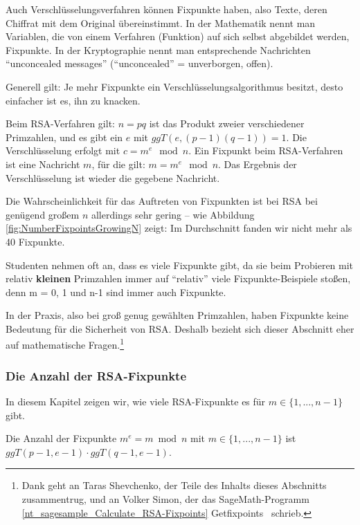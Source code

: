 \begin{refsegment}
Auch Verschlüsselungsverfahren können Fixpunkte haben, also Texte, deren Chiffrat
mit dem Original übereinstimmt. In der Mathematik nennt man Variablen, die von einem
Verfahren (Funktion) auf sich selbst abgebildet werden, Fixpunkte. In der Kryptographie nennt man entsprechende Nachrichten "`unconcealed messages"' ("`unconcealed"' = unverborgen, offen).

Generell gilt: Je mehr Fixpunkte ein Verschlüsselungsalgorithmus besitzt,
desto einfacher ist es, ihn zu knacken.

Beim RSA-Verfahren gilt: $n=pq$ ist das Produkt zweier verschiedener Primzahlen, und
es gibt ein $e$ mit $ggT(e,(p-1)(q-1))=1$. Die Verschlüsselung erfolgt mit
$c = m^e \mod n$.
Ein Fixpunkt beim RSA-Verfahren ist eine Nachricht $m$, für die gilt:
$m = m^e \mod n$. Das Ergebnis der Verschlüsselung ist wieder die gegebene
Nachricht.

Die Wahrscheinlichkeit für das Auftreten von Fixpunkten ist bei RSA bei genügend
großem $n$ allerdings sehr gering -- wie Abbildung \ref{fig:NumberFixpointsGrowingN}
zeigt: Im Durchschnitt fanden wir nicht mehr als 40 Fixpunkte.

Studenten nehmen oft an, dass es viele Fixpunkte gibt, da sie beim Probieren mit
relativ \textbf{kleinen} Primzahlen immer auf "`relativ"' viele Fixpunkte-Beispiele
stoßen, denn m = 0, 1 und n-1 sind immer auch Fixpunkte.

In der Praxis, also bei groß genug gewählten Primzahlen, haben Fixpunkte keine
Bedeutung für die Sicherheit von RSA. Deshalb bezieht sich dieser Abschnitt
eher auf mathematische Fragen.\footnote{%
Dank geht an Taras Shevchenko, der Teile des Inhalts dieses Abschnitts zusammentrug, und an Volker Simon, der das SageMath-Programm \ref{nt_sagesample_Calculate_RSA-Fixpoints}
\glqq Getfixpoints\grqq~%
schrieb.}


\subsubsection{Die Anzahl der RSA-Fixpunkte}
In diesem Kapitel zeigen wir, wie viele RSA-Fixpunkte es für $m \in \{1,...,n-1\} $ gibt.\\

\begin{satz}\label{nt-number-of-fixpoints-1-to-n-1}
  Die Anzahl der Fixpunkte $ m^e = m \bmod n$ mit
  $m \in \{1,...,n-1\} $ ist \\$ ggT(p-1, e-1) \cdot ggT(q-1, e-1) $.
\end{satz}


\end{refsegment}
